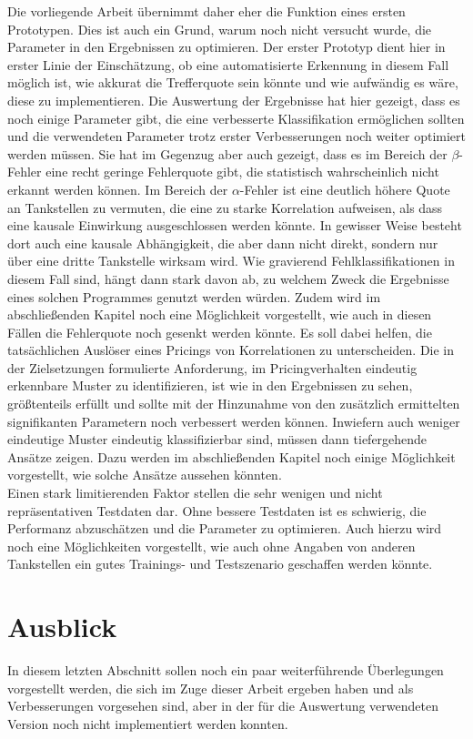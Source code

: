 Die vorliegende Arbeit übernimmt daher eher die Funktion eines ersten Prototypen. Dies ist auch ein Grund, warum noch nicht versucht wurde, die Parameter in den Ergebnissen zu optimieren. Der erster Prototyp dient hier in erster Linie der Einschätzung, ob eine automatisierte Erkennung in diesem Fall möglich ist, wie akkurat die Trefferquote sein könnte und wie aufwändig es wäre, diese zu implementieren. Die Auswertung der Ergebnisse hat hier gezeigt, dass es noch einige Parameter gibt, die eine verbesserte Klassifikation ermöglichen sollten und die verwendeten Parameter trotz erster Verbesserungen noch weiter optimiert werden müssen. Sie hat im Gegenzug aber auch gezeigt, dass es im Bereich der $\beta$-Fehler eine recht geringe Fehlerquote gibt, die statistisch wahrscheinlich nicht erkannt werden können. Im Bereich der $\alpha$-Fehler ist eine deutlich höhere Quote an Tankstellen zu vermuten, die eine zu starke Korrelation aufweisen, als dass eine kausale Einwirkung ausgeschlossen werden könnte. In gewisser Weise besteht dort auch eine kausale Abhängigkeit, die aber dann nicht direkt, sondern nur über eine dritte Tankstelle wirksam wird. Wie gravierend Fehlklassifikationen in diesem Fall sind, hängt dann stark davon ab, zu welchem Zweck die Ergebnisse eines solchen Programmes genutzt werden würden. Zudem wird im abschließenden Kapitel noch eine Möglichkeit vorgestellt, wie auch in diesen Fällen die Fehlerquote noch gesenkt werden könnte. Es soll dabei helfen, die tatsächlichen Auslöser eines Pricings von Korrelationen zu unterscheiden. Die in der Zielsetzungen formulierte Anforderung, im Pricingverhalten eindeutig erkennbare Muster zu identifizieren, ist wie in den Ergebnissen zu sehen, größtenteils erfüllt und sollte mit der Hinzunahme von den zusätzlich ermittelten signifikanten Parametern noch verbessert werden können. Inwiefern auch weniger eindeutige Muster eindeutig klassifizierbar sind, müssen dann tiefergehende Ansätze zeigen. Dazu werden im abschließenden Kapitel noch einige Möglichkeit vorgestellt, wie solche Ansätze aussehen könnten.\\
Einen stark limitierenden Faktor stellen die sehr wenigen und nicht repräsentativen Testdaten dar. Ohne bessere Testdaten ist es schwierig, die Performanz abzuschätzen und die Parameter zu optimieren. Auch hierzu wird noch eine Möglichkeiten vorgestellt, wie auch ohne Angaben von anderen Tankstellen ein gutes Trainings- und Testszenario geschaffen werden könnte.\\

\section{Ausblick}
In diesem letzten Abschnitt sollen noch ein paar weiterführende Überlegungen vorgestellt werden, die sich im Zuge dieser Arbeit ergeben haben und als Verbesserungen vorgesehen sind, aber in der für die Auswertung verwendeten Version noch nicht implementiert werden konnten.

